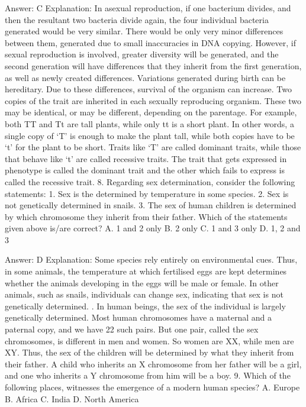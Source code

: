 Answer: C
Explanation: In asexual reproduction, if one bacterium divides, and then the resultant two bacteria divide again, the four individual bacteria generated would be very similar. There would be only very minor differences between them, generated due to small inaccuracies in DNA copying. However, if sexual reproduction is involved, greater diversity will be generated, and the second generation will have differences that they inherit from the first generation, as well as newly created differences. Variations generated during birth can be hereditary. Due to these differences, survival of the organism can increase. Two copies of the trait are inherited in each sexually reproducing organism. These two may be identical, or may be different, depending on the parentage. For example, both TT and Tt are tall plants, while only tt is a short plant. In other words, a single copy of ‘T’ is enough to make the plant tall, while both copies have to be ‘t’ for the plant to be short. Traits like ‘T’ are called dominant traits, while those that behave like ‘t’ are called recessive traits. The trait that gets expressed in phenotype is called the dominant trait and the other which fails to express is called the recessive trait. 8. Regarding sex determination, consider the following statements: 1. Sex is the determined by temperature in some species. 2. Sex is not genetically determined in snails. 3. The sex of human children is determined by which chromosome they inherit from their father. Which of the statements given above is/are correct? A. 1 and 2 only B. 2 only C. 1 and 3 only D. 1, 2 and 3 

Answer: D
Explanation: Some species rely entirely on environmental cues. Thus, in some animals, the temperature at which fertilised eggs are kept determines whether the animals developing in the eggs will be male or female. In other animals, such as snails, individuals can change sex, indicating that sex is not genetically determined. . In human beings, the sex of the individual is largely genetically determined. Most human chromosomes have a maternal and a paternal copy, and we have 22 such pairs. But one pair, called the sex chromosomes, is different in men and women. So women are XX, while men are XY. Thus, the sex of the children will be determined by what they inherit from their father. A child who inherits an X chromosome from her father will be a girl, and one who inherits a Y chromosome from him will be a boy. 9. Which of the following places, witnesses the emergence of a modern human species? A. Europe B. Africa C. India D. North America 

